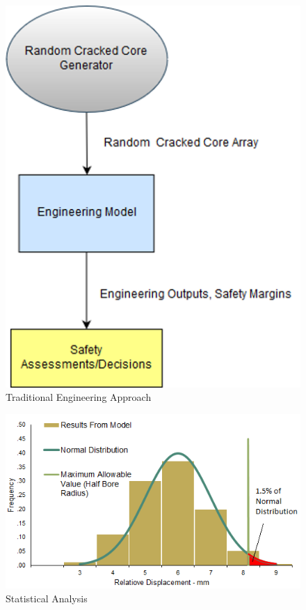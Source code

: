 \begin{figure}[b!]
	\centering
	\includegraphics[scale=0.5]{Figures/engineering_approach}
	\caption{Traditional Engineering Approach}
	\label{fig:traditional}
\end{figure}

\begin{figure}[t]
	\centering
	\includegraphics[scale=0.55]{Figures/Statistical_analysis}
	\caption{Statistical Analysis}
	\label{fig:statistical_analysis}
\end{figure}

